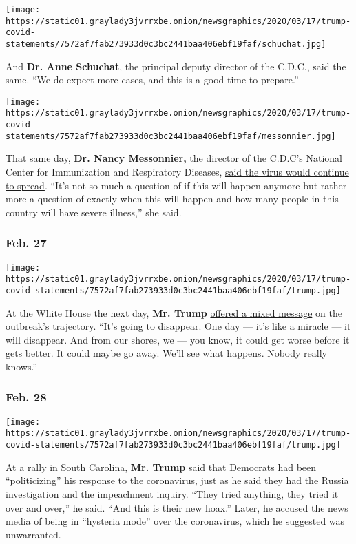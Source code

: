 \texttt{[image: https://static01.graylady3jvrrxbe.onion/newsgraphics/2020/03/17/trump-covid-statements/7572af7fab273933d0c3bc2441baa406ebf19faf/schuchat.jpg]}

And \textbf{Dr. Anne Schuchat}, the principal deputy director of the
C.D.C., said the same. ``We do expect more cases, and this is a good
time to prepare.''

\texttt{[image: https://static01.graylady3jvrrxbe.onion/newsgraphics/2020/03/17/trump-covid-statements/7572af7fab273933d0c3bc2441baa406ebf19faf/messonnier.jpg]}

That same day, \textbf{Dr. Nancy Messonnier,} the director of the
C.D.C's National Center for Immunization and Respiratory Diseases,
\href{https://www.cdc.gov/media/releases/2020/t0225-cdc-telebriefing-covid-19.html}{said
the virus would continue to spread}. ``It's not so much a question of if
this will happen anymore but rather more a question of exactly when this
will happen and how many people in this country will have severe
illness,'' she said.

\hypertarget{feb-27}{%
\subsubsection{Feb. 27}\label{feb-27}}

\texttt{[image: https://static01.graylady3jvrrxbe.onion/newsgraphics/2020/03/17/trump-covid-statements/7572af7fab273933d0c3bc2441baa406ebf19faf/trump.jpg]}

At the White House the next day, \textbf{Mr. Trump}
\href{https://www.youtube.com/watch?v=Aas3YQKIFeY}{offered a mixed
message} on the outbreak's trajectory. ``It's going to disappear. One
day --- it's like a miracle --- it will disappear. And from our shores,
we --- you know, it could get worse before it gets better. It could
maybe go away. We'll see what happens. Nobody really knows.''

\hypertarget{feb-28}{%
\subsubsection{Feb. 28}\label{feb-28}}

\texttt{[image: https://static01.graylady3jvrrxbe.onion/newsgraphics/2020/03/17/trump-covid-statements/7572af7fab273933d0c3bc2441baa406ebf19faf/trump.jpg]}

At
\href{https://www.c-span.org/video/?469663-1/president-trump-campaign-event-north-charleston-south-carolina\&start=395}{a
rally in South Carolina}, \textbf{Mr. Trump} said that Democrats had
been ``politicizing'' his response to the coronavirus, just as he said
they had the Russia investigation and the impeachment inquiry. ``They
tried anything, they tried it over and over,'' he said. ``And this is
their new hoax.'' Later, he accused the news media of being in
``hysteria mode'' over the coronavirus, which he suggested was
unwarranted.

